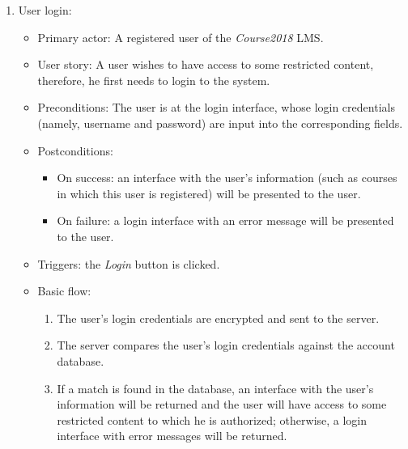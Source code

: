 \begin{enumerate}
\item User login:
\begin{itemize}
\item Primary actor:
    A registered user of the \emph{Course2018} LMS.
\item User story:
    A user wishes to have access to some restricted content, therefore, he
    first needs to login to the system.
\item Preconditions:
    The user is at the login interface, whose login credentials
    (namely, username and password) are input into the corresponding fields.
\item Postconditions:
    \begin{itemize}
        \item On success: an interface with the user's information (such as courses
            in which this user is registered) will be presented to the user.
        \item On failure: a login interface with an error message will be
            presented to the user.
    \end{itemize}
\item Triggers: the \emph{Login} button is clicked.
\item Basic flow:
    \begin{enumerate}
        \item The user's login credentials are encrypted and sent to the
            server.
        \item The server compares the user's login credentials against the
            account database.
        \item If a match is found in the database, an interface with the user's
            information will be returned and the user will have access to
            some restricted content to which he is authorized; otherwise, a
            login interface with error messages will be returned.
    \end{enumerate}
\end{itemize}


\end{enumerate}
